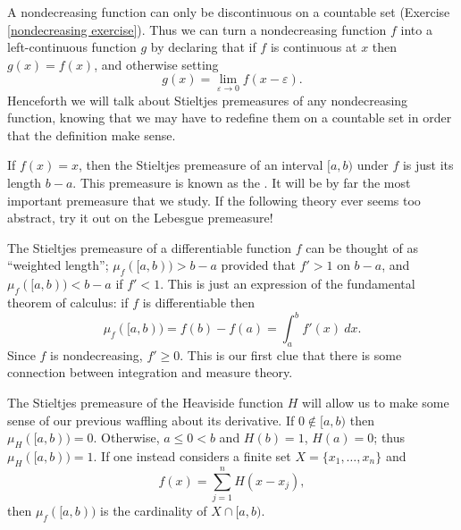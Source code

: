 \begin{subsec}
A nondecreasing function can only be discontinuous on a countable set (Exercise \ref{nondecreasing exercise}).
Thus we can turn a nondecreasing function $f$ into a left-continuous function $g$ by declaring that if $f$ is continuous at $x$ then $g(x) = f(x)$, and otherwise setting
\[g(x) = \lim_{\varepsilon \to 0} f(x - \varepsilon).\]
Henceforth we will talk about Stieltjes premeasures of any nondecreasing function, knowing that we may have to redefine them on a countable set in order that the definition make sense.
\end{subsec}

\begin{example}
If $f(x) = x$, then the Stieltjes premeasure of an interval $[a, b)$ under $f$ is just its length $b - a$.
This premeasure is known as the .
It will be by far the most important premeasure that we study.
If the following theory ever seems too abstract, try it out on the Lebesgue premeasure!
\end{example}

\begin{example}
The Stieltjes premeasure of a differentiable function $f$ can be thought of as ``weighted length''; $\mu_f([a, b)) > b - a$ provided that $f' > 1$ on $b - a$, and $\mu_f([a, b)) < b - a$ if $f' < 1$.
This is just an expression of the fundamental theorem of calculus: if $f$ is differentiable then
\[\mu_f([a, b)) = f(b) - f(a) = \int_{a}^{b} f'(x)~dx.\]
Since $f$ is nondecreasing, $f' \geq 0$.
This is our first clue that there is some connection between integration and measure theory.
\end{example}

\begin{example}
The Stieltjes premeasure of the Heaviside function $H$ will allow us to make some sense of our previous waffling about its derivative.
If $0 \notin [a, b)$ then $\mu_H([a, b)) = 0$.
Otherwise, $a \leq 0 < b$ and $H(b) = 1$, $H(a) = 0$; thus $\mu_H([a, b)) = 1$.
If one instead considers a finite set $X = \{x_1, \dots, x_{n}\}$ and
\[f(x) = \sum_{j=1}^{n} H(x - x_{j}),\]
then $\mu_f([a, b))$ is the cardinality of $X \cap [a, b)$.
\end{example}

